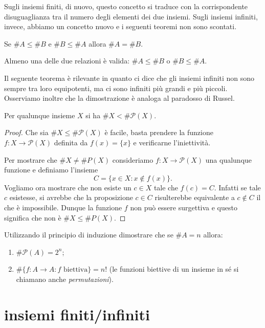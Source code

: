 \documentclass[italian,a4paper,hidelinks]{scrartcl}
\renewcommand{\P}{{\mathcal P}}
\begin{document}
Sugli insiemi finiti, di nuovo, questo concetto
si traduce con la corrispondente
disuguaglianza tra il numero degli elementi dei due insiemi.
Sugli insiemi infiniti, invece, abbiamo un concetto nuovo e i seguenti teoremi
non sono scontati.

\begin{theorem}
Se $\#A \le \#B$ e $\#B \le \#A$ allora $\#A = \#B$.
\end{theorem}

\begin{theorem}
Almeno una delle due relazioni è valida: $\#A \le \#B$ o $\#B \le \#A$.
\end{theorem}

Il seguente teorema è rilevante in quanto ci dice che gli insiemi infiniti
non sono sempre tra loro equipotenti, ma ci sono infiniti più grandi e più piccoli.
Osserviamo inoltre che la dimostrazione è
analoga al paradosso di Russel.

\begin{theorem}[Cantor]
Per qualunque insieme $X$ si ha $\# X < \# \P(X)$.
\end{theorem}
%
\begin{proof}
Che sia $\#X\le \#\P(X)$ è facile, basta prendere la funzione
$f\colon X\to \P(X)$ definita da $f(x) = \{x\}$ e verificarne
l'iniettività.

Per mostrare che $\# X \neq \#P(X)$ consideriamo
$f\colon X \to \P(X)$ una qualunque funzione
e definiamo l'insieme
\[
   C = \{x \in X \colon x \not \in f(x) \}.
\]
Vogliamo ora mostrare che non esiste un $c\in X$ tale che $f(c) = C$.
Infatti se tale $c$ esistesse, si avrebbe che la proposizione
$c\in C$ risulterebbe equivalente a $c\not \in C$ il che è impossibile.
Dunque la funzione $f$ non può essere surgettiva e questo significa che
non è $\#X \le \#P(X)$.
\end{proof}

\begin{exercise}
Utilizzando il principio di induzione dimostrare che se $\# A = n$ allora:
\begin{enumerate}
    \item $\# \P(A) = 2^n$;
    \item $\# \{f\colon A \to A\colon \text{$f$ biettiva}\} = n!$
      (le funzioni biettive di un insieme in sé si chiamano anche
      \emph{permutazioni}).
\end{enumerate}
\end{exercise}


\section{insiemi finiti/infiniti}
\end{document}
